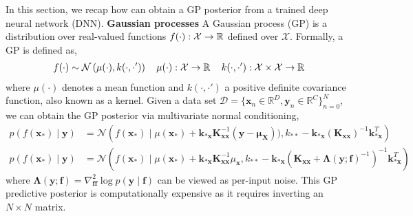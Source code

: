 \documentclass{article}
\newcommand{\dataset}{\ensuremath{\mathcal{D}}}
\newcommand{\inputDomain}{\ensuremath{\mathbb{R}^{D}}}
\newcommand{\outputDomain}{\ensuremath{\mathbb{R}^{C}}}
\newcommand{\transitionFn}{\ensuremath{f}}
\newcommand{\transitionParams}{\ensuremath{\mathbf{w}}}
\newcommand{\transitionFnWithParams}{\ensuremath{\transitionFn_{\transitionParams}}}
\begin{document}
In this section, we recap how can obtain a GP posterior from a trained deep neural network (DNN).
\textbf{Gaussian processes}
A Gaussian process (GP) is a distribution over real-valued functions $f(\cdot): \mathcal{X} \rightarrow \operatorname{\mathbb{R}}$ defined over $\mathcal{X}$.
Formally, a GP is defined as,
\begin{align}
\label{eq-gp-prior}
  f(\cdot) \sim \mathcal{N}\left( \mu(\cdot), k(\cdot,\cdot') \right) \quad
  \mu(\cdot): \mathcal{X} \rightarrow \operatorname{\mathbb{R}} \quad
  k(\cdot,\cdot'): \mathcal{X} \times \mathcal{X} \rightarrow \operatorname{\mathbb{R}}
\end{align}
where $\mu(\cdot)$ denotes a mean function and $k(\cdot,\cdot')$ a positive definite covariance function, also known as a kernel.
Given a data set $\dataset = \{\mathbf{x}_{n} \in \inputDomain, \mathbf{y}_{n} \in \outputDomain\}_{n=0}^{N}$,
we can obtain the GP posterior via multivariate normal conditioning,
\begin{align}
\label{eq-gp-predictive-posterior}
  p(f(\mathbf{x}_{*}) \mid \mathbf{y}) &= \mathcal{N}
  \left( f(\mathbf{x}_{*}) \mid \mu(\mathbf{x}_{*}) + \mathbf{k}_{*\mathbf{x}} \mathbf{K}^{-1}_{\mathbf{x}\mathbf{x}} (\mathbf{y} - \bm\mu_{\mathbf{X}})),
  k_{**} - \mathbf{k}_{*\mathbf{x}} \left(\mathbf{K}_{\mathbf{x}\mathbf{x}} \right)^{-1} \mathbf{k}_{*\mathbf{x}}^{T} \right)
\end{align}
\begin{align}
\label{eq-gp-predictive-posterior}
  p(f(\mathbf{x}_{*}) \mid \mathbf{y}) &= \mathcal{N}
  \left( f(\mathbf{x}_{*}) \mid \mu(\mathbf{x}_{*}) + \mathbf{k}_{*\mathbf{x}} \mathbf{K}^{-1}_{\mathbf{x}\mathbf{x}} \mu_{\mathbf{x}},
  k_{**} - \mathbf{k}_{*\mathbf{x}} \left(\mathbf{K}_{\mathbf{x}\mathbf{x}} + \bm\Lambda(\mathbf{y} ; \mathbf{f})^{-1} \right)^{-1} \mathbf{k}_{*\mathbf{x}}^{T} \right)
\end{align}
where $\bm\Lambda(\mathbf{y} ; \mathbf{f}) = \nabla^{2}_{\mathbf{f} \mathbf{f}} \log p(\mathbf{y} \mid \mathbf{f})$ can be viewed as per-input noise. 
This GP predictive posterior is computationally expensive as it requires inverting an $N\times N$ matrix.
\end{document}

